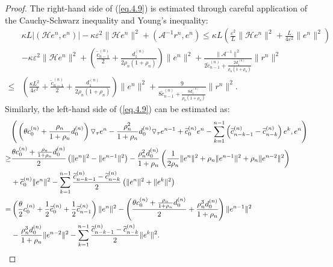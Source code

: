 \documentclass[10pt,a4paper]{amsart}
\begin{document}
\begin{proof}
The right-hand side of (\ref{eq.4.9}) is estimated through careful application of the Cauchy-Schwarz inequality and Young's inequality:
	\begin{align*}
		& \kappa L|\left(\mathcal{H}e^n,e^n \right)|-\kappa \varepsilon^2 \|\mathcal{H} e^n \|^2
		+\left(\mathscr{A}^{-1}r^n, e^n\right)
		\leq  \kappa L\left(\frac{\varepsilon^2}{L}\|\mathcal{H} e^n\|^2+\frac{L} {4\varepsilon^2 }\|e^n\|^2 \right) \\
		&-\kappa \varepsilon^2 \|\mathcal{H} e^n \|^2+\left( \frac{\widetilde{c}_{n-1}^{(n)} }{2}+ \frac{ d_{1}^{(n)} }	{2\rho_{n}\left(1+\rho_{n} \right)}\right)\|e^n\|^2+\frac{\|\mathscr{A}^{-1}\|^2} {2\widetilde{c}_{n-1}^{(n)}+ \frac{2 d_{1}^{(n)} }	{\rho_{n}\left(1+\rho_{n} \right)} }\|r^n\|^2\\
		\leq&\left(\frac{\kappa L^2} {4\varepsilon^2 }+ \frac{\widetilde{c}_{n-1}^{(n)} }{2}+ \frac{ d_{1}^{(n)} }	{2\rho_{n}\left(1+\rho_{n} \right)}\right)\|e^n\|^2+\frac{9} {8\widetilde{c}_{n-1}^{(n)}+ \frac{8 d_{1}^{(n)} }	{\rho_{n}\left(1+\rho_{n} \right)} }\|r^n\|^2.
	\end{align*}
Similarly, the left-hand side of (\ref{eq.4.9}) can be estimated as:
\begin{align*}
		&\Bigg{(} \left( \theta c_{0}^{(n)}+  \frac{\rho_{n}}{1+\rho_{n}}d_{0}^{(n)} \right) \triangledown_\tau e^{n} -\frac{\rho_{n}^2}  {1+\rho_{n}}d_{0}^{(n)} \triangledown_\tau e^{n-1}  +\widetilde{c}_{0}^{(n)}  e^{n} -\sum\limits_{k=1}^{n-1} \left( \widetilde{c}_{n-k-1}^{(n)} -\widetilde{c}_{n-k}^{(n)} \right)  e^{k} ,e^n\Bigg{)}\\
		\ge &\frac{\theta c_{0}^{(n)}+  \frac{\rho_{n}}{1+\rho_{n}}d_{0}^{(n)}} {2}\left(\|e^n \|^2 -\|e^{n-1} \|^2\right)-\frac{\rho_{n}^2 d_{0}^{(n)}}{1+\rho_{n}}\left(\frac{1}{2\rho_{n}} \|e^n \|^2 +\rho_{n}\|e^{n-1} \|^2 +\rho_{n}\|e^{n-2} \|^2\right) \\ &+ \widetilde{c}_{0}^{(n)} \|e^n \|^2 -\sum\limits_{k=1}^{n-1}\frac{\widetilde{c}_{n-k-1}^{(n)} -\widetilde{c}_{n-k}^{(n)} }{2}\left(\|e^n \|^2+ \|e^k \|^2 \right) \\
		=&\left(\frac{\theta} {2}c_{0}^{(n)}+\frac{1 }{2}\widetilde{c}_{0}^{(n)} +\frac{1}{2}\widetilde{c}_{n-1}^{(n)}\right) \|e^n \|^2 -\left(\frac{\theta c_{0}^{(n)}+  \frac{\rho_{n}}{1+\rho_{n}}d_{0}^{(n)}} {2} +\frac{\rho_{n}^3 d_{0}^{(n)}}{1+\rho_{n}}\right)\|e^{n-1} \|^2\\
		&-\frac{\rho_{n}^3 d_{0}^{(n)}}{1+\rho_{n}} \|e^{n-2} \|^2
		-\sum\limits_{k=1}^{n-1}\frac{\widetilde{c}_{n-k-1}^{(n)} -\widetilde{c}_{n-k}^{(n)} }{2}\|e^k \|^2.

\end{align*}
\end{proof}
\end{document}
